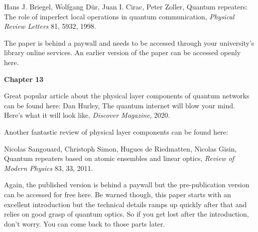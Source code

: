 Hans J. Briegel, Wolfgang Dür, Juan I. Cirac, Peter Zoller, Quantum repeaters: The role of imperfect local operations in quantum communication, \emph{Physical Review Letters} 81, 5932, 1998.

The paper is behind a paywall and needs to be accessed through your university’s library online services. An earlier version of the paper can be accessed openly here.

{\bf Chapter 13}

Great popular article about the physical layer components of quantum networks can be found here:
Dan Hurley, The quantum internet will blow your mind. Here’s what it will look like, \emph{Discover Magazine}, 2020.

Another fantastic review of physical layer components can be found here:

Nicolas Sangouard, Christoph Simon, Hugues de Riedmatten, Nicolas Gisin, Quantum repeaters based on atomic ensembles and linear optics, \emph{Review of Modern Physics} 83, 33, 2011.

Again, the published version is behind a paywall but the pre-publication version can be accessed for free here. Be warned though, this paper starts with an excellent introduction but the technical details ramps up quickly after that and relies on good grasp of quantum optics. So if you get lost after the introduction, don’t worry. You can come back to those parts later.

